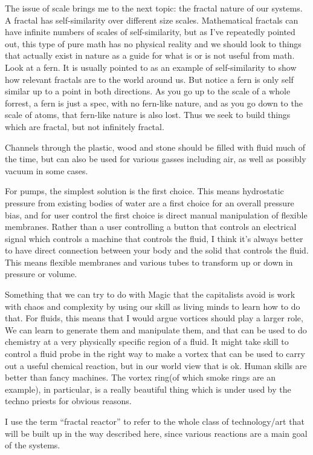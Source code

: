 The issue of scale brings me to the next topic: the fractal nature of
our systems. A fractal has self-similarity over different size scales.
Mathematical fractals can have infinite numbers of scales of
self-similarity, but as I've repeatedly pointed out, this type of pure
math has no physical reality and we should look to things that actually
exist in nature as a guide for what is or is not useful from math. Look
at a fern. It is usually pointed to as an example of self-similarity to
show how relevant fractals are to the world around us. But notice a fern
is only self similar up to a point in both directions. As you go up to
the scale of a whole forrest, a fern is just a spec, with no fern-like
nature, and as you go down to the scale of atoms, that fern-like nature
is also lost. Thus we seek to build things which are fractal, but not
infinitely fractal.

Channels through the plastic, wood and stone should be filled with fluid
much of the time, but can also be used for various gasses including air,
as well as possibly vacuum in some cases.

For pumps, the simplest solution is the first choice. This means
hydrostatic pressure from existing bodies of water are a first choice
for an overall pressure bias, and for user control the first choice is
direct manual manipulation of flexible membranes. Rather than a user
controlling a button that controls an electrical signal which controls a
machine that controls the fluid, I think it's always better to have
direct connection between your body and the solid that controls the
fluid. This means flexible membranes and various tubes to transform up
or down in pressure or volume.

Something that we can try to do with Magic that the capitalists avoid is
work with chaos and complexity by using our skill as living minds to
learn how to do that. For fluids, this means that I would argue vortices
should play a larger role, We can learn to generate them and manipulate
them, and that can be used to do chemistry at a very physically specific
region of a fluid. It might take skill to control a fluid probe in the
right way to make a vortex that can be used to carry out a useful
chemical reaction, but in our world view that is ok. Human skills are
better than fancy machines. The vortex ring(of which smoke rings are an
example), in particular, is a really beautiful thing which is under used
by the techno priests for obvious reasons.

I use the term ``fractal reactor'' to refer to the whole class of
technology/art that will be built up in the way described here, since
various reactions are a main goal of the systems.


